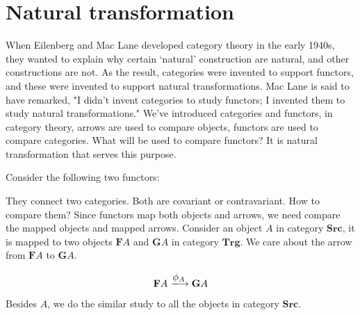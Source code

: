 \documentclass{article}
\begin{document}
\section{Natural transformation}

When Eilenberg and Mac Lane developed category theory in the early 1940s, they wanted to explain why certain ‘natural’ construction are natural, and other constructions are not. As the result, categories were invented to support functors, and these were invented to support natural transformations. Mac Lane is said to have remarked, "I didn't invent categories to study functors; I invented them to study natural transformations." We've introduced categories and functors, in category theory, arrows are used to compare objects, functors are used to compare categories. What will be used to compare functors? It is natural transformation that serves this purpose.

Consider the following two functors:

\begin{center}
\end{center}

They connect two categories. Both are covariant or contravariant. How to compare them? Since functors map both objects and arrows, we need compare the mapped objects and mapped arrows. Consider an object $A$ in category $\pmb{Src}$, it is mapped to two objects $\mathbf{F}A$ and $\mathbf{G}A$ in category $\pmb{Trg}$. We care about the arrow from $\mathbf{F}A$ to $\mathbf{G}A$.

\[
\mathbf{F}A \arrowto{\phi_A} \mathbf{G}A
\]

Besides $A$, we do the similar study to all the objects in category $\pmb{Src}$.
\end{document}
